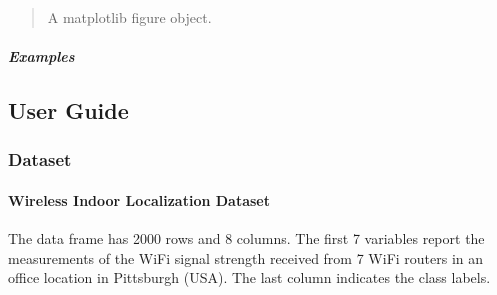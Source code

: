\documentclass[letterpaper,10pt,english,openany,oneside]{sphinxmanual}
\begin{document}
\begin{fulllineitems}
\begin{quote}
\sphinxAtStartPar
A matplotlib figure object.
\end{quote}


\subparagraph{Examples}
\label{\detokenize{api_reference/generated/QuadratiK.tools.plot_clusters_2d:examples}}
\begin{sphinxVerbatim}[commandchars=\\\{\}]
   
   
  
     
\end{sphinxVerbatim}

\end{fulllineitems}




\sphinxstepscope


\subsection{User Guide}
\label{\detokenize{user_guide/index:user-guide}}\label{\detokenize{user_guide/index::doc}}

\subsubsection{Dataset}
\label{\detokenize{user_guide/index:dataset}}
\sphinxstepscope


\paragraph{Wireless Indoor Localization Dataset}
\label{\detokenize{user_guide/datasets:wireless-indoor-localization-dataset}}\label{\detokenize{user_guide/datasets:datasets}}\label{\detokenize{user_guide/datasets:id1}}\label{\detokenize{user_guide/datasets::doc}}
\sphinxAtStartPar
The  data frame has 2000 rows and 8 columns. The first 7 variables
report the measurements of the Wi\sphinxhyphen{}Fi signal strength received from 7 Wi\sphinxhyphen{}Fi routers in an
office location in Pittsburgh (USA). The last column indicates the class labels.
\end{document}

